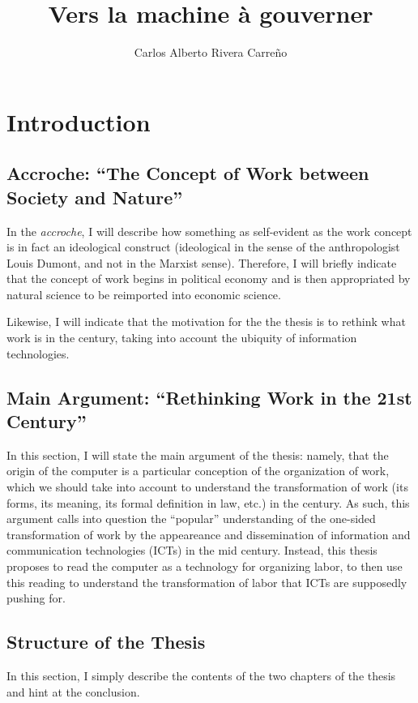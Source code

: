 \documentclass[version=last,draft=false,paper=A4,portrait,twoside=true,twocolumn=true,headinclude=false,footinclude=false,fontsize=12,BCOR=20mm,DIV=13,pagesize=auto,titlepage=false,mpinclude=false,open=right,chapterprefix=true,numbers=autoendperiod,headsepline=false,parskip=false]{scrbook}
\author{Carlos Alberto Rivera Carreño}
\date{}
\title{Vers la machine à gouverner}
\begin{document}
\maketitle
\nocite{*}
\chapter{Introduction}
\label{sec:org2bedf22}
\section{Accroche: ``The Concept of Work between Society and Nature''}
\label{sec:org2308320}
In the \emph{accroche}, I will describe how something as self-evident as the work
concept is in fact an ideological construct (ideological in the sense of
the anthropologist Louis Dumont, and not in the Marxist sense). Therefore,
I will briefly indicate that the concept of work begins in political
economy and is then appropriated by natural science to be reimported into
economic science.  

Likewise, I will indicate that the motivation for the the thesis is to
rethink what work is in the  century, taking into account the ubiquity
of information technologies. 

\printbibliography[heading=none,keyword=introduction-1]
\section{Main Argument: ``Rethinking Work in the 21st Century''}
\label{sec:org85454dd}
In this section, I will state the main argument of the thesis: namely, that
the origin of the computer is a particular conception of the organization
of work, which we should take into account to understand the transformation
of work (its forms, its meaning, its formal definition in law, etc.) in the
 century. As such, this argument calls into question the ``popular''
understanding of the one-sided transformation of work by the appeareance
and dissemination of information and communication technologies (ICTs) in
the mid  century. Instead, this thesis proposes to read the
computer as a technology for organizing labor, to then use this reading to
understand the transformation of labor that ICTs are supposedly pushing
for. 

\printbibliography[heading=none,keyword=introduction-2]
\section{Structure of the Thesis}
\label{sec:orgc4926e9}
In this section, I simply describe the contents of the two chapters of the
thesis and hint at the conclusion. 
\end{document}
